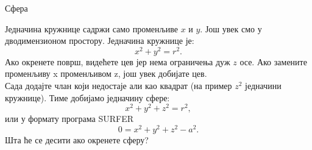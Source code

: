 ﻿\documentclass[en]{./../../common/SurferDesc}%
\begin{document}
\footnotesize
%
\begin{surferPage}
  \begin{surferTitle}Сфера\end{surferTitle}
   \begin{surferText}
   
Једначина кружнице садржи само променљиве $x$ и $y$. Још увек смо у дводимензионом простору.
Једначина кружнице је:
\[x^2+y^2=r^2.\]
Ако окренете површ, видећете цев јер нема ограничења дуж $z$ осе. Ако замените променљиву x променљивом  z, још увек добијате цев.\\
Сада додајте члан који недостаје али као квадрат (на пример $z^2$ једначини кружнице). 
Тиме добијамо једначину сфере:
\[x^2+y^2+z^2=r^2,\]
или у формату програма SURFER
\[0=x^2+y^2+z^2-a^2.\]
Шта ће се десити ако окренете сферу?

     \end{surferText}
\end{surferPage}
\end{document}
